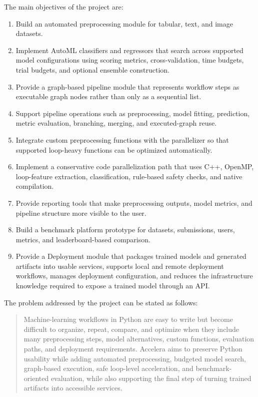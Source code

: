 \documentclass[12pt,a4paper]{report}
\begin{document}
\medskip
\noindent The main objectives of the project are:

\begin{enumerate}
  \item Build an automated preprocessing module for tabular, text, and image
  datasets.

  \item Implement AutoML classifiers and regressors that search across supported
  model configurations using scoring metrics, cross-validation, time budgets,
  trial budgets, and optional ensemble construction.

  \item Provide a graph-based pipeline module that represents workflow steps as
  executable graph nodes rather than only as a sequential list.

  \item Support pipeline operations such as preprocessing, model fitting,
  prediction, metric evaluation, branching, merging, and executed-graph reuse.

  \item Integrate custom preprocessing functions with the parallelizer so that
  supported loop-heavy functions can be optimized automatically.

  \item Implement a conservative code parallelization path that uses C++,
  OpenMP, loop-feature extraction, classification, rule-based safety checks, and
  native compilation.

  \item Provide reporting tools that make preprocessing outputs, model metrics,
  and pipeline structure more visible to the user.

  \item Build a benchmark platform prototype for datasets, submissions, users,
  metrics, and leaderboard-based comparison.

  \item Provide a Deployment module that packages trained models and generated
  artifacts into usable services, supports local and remote deployment
  workflows, manages deployment configuration, and reduces the infrastructure
  knowledge required to expose a trained model through an API.
\end{enumerate}

\medskip
\noindent The problem addressed by the project can be stated as follows:

\begin{quote}
Machine-learning workflows in Python are easy to write but become difficult to
organize, repeat, compare, and optimize when they include many preprocessing
steps, model alternatives, custom functions, evaluation paths, and deployment
requirements. Accelera aims
to preserve Python usability while adding automated preprocessing, budgeted
model search, graph-based execution, safe loop-level acceleration, and
benchmark-oriented evaluation, while also supporting the final step of turning
trained artifacts into accessible services.
\end{quote}
\end{document}
